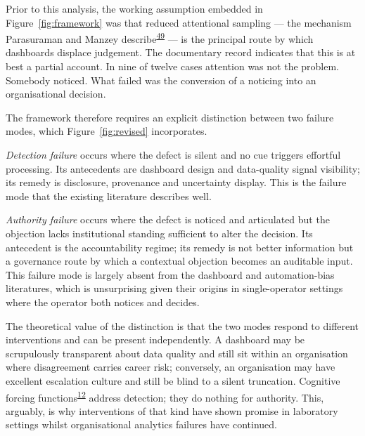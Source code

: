 \documentclass[11pt,a4paper]{article}
\numberwithin{figure}{section}
\numberwithin{table}{section}
\begin{document}
Prior to this analysis, the working assumption embedded in Figure~\ref{fig:framework} was that reduced
attentional sampling --- the mechanism Parasuraman and Manzey describe\textsuperscript{\hyperlink{ref49}{49}} --- is the
principal route by which dashboards displace judgement. The documentary record indicates that this is at
best a partial account. In nine of twelve cases attention was not the problem. Somebody noticed. What failed
was the conversion of a noticing into an organisational decision.

The framework therefore requires an explicit distinction between two failure modes, which
Figure~\ref{fig:revised} incorporates.

\emph{Detection failure} occurs where the defect is silent and no cue triggers effortful processing. Its
antecedents are dashboard design and data-quality signal visibility; its remedy is disclosure, provenance
and uncertainty display. This is the failure mode that the existing literature describes well.

\emph{Authority failure} occurs where the defect is noticed and articulated but the objection lacks
institutional standing sufficient to alter the decision. Its antecedent is the accountability regime; its
remedy is not better information but a governance route by which a contextual objection becomes an
auditable input. This failure mode is largely absent from the dashboard and automation-bias literatures,
which is unsurprising given their origins in single-operator settings where the operator both notices and
decides.

The theoretical value of the distinction is that the two modes respond to different interventions and can
be present independently. A dashboard may be scrupulously transparent about data quality and still sit
within an organisation where disagreement carries career risk; conversely, an organisation may have
excellent escalation culture and still be blind to a silent truncation. Cognitive forcing
functions\textsuperscript{\hyperlink{ref12}{12}} address detection; they do nothing for authority. This, arguably, is why
interventions of that kind have shown promise in laboratory settings whilst organisational analytics
failures have continued.
\end{document}

